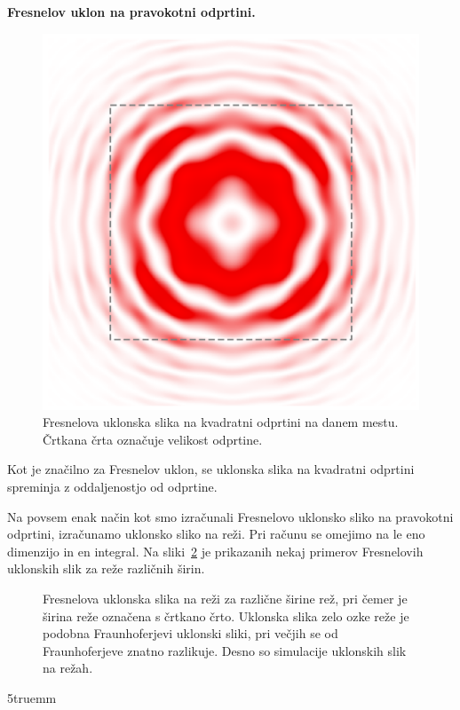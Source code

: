\begin{example}{\bf Fresnelov uklon na pravokotni odprtini.}
\begin{figure}[ht]
\includegraphics[width=50truemm]{slike/05_FresKvadrat.png}
\caption{Fresnelova uklonska slika na kvadratni odprtini na danem mestu. 
Črtkana črta označuje velikost odprtine.}
\label{fig:05_FrKv}
\end{figure}
Kot je značilno za Fresnelov uklon, se uklonska slika na kvadratni odprtini spreminja
z oddaljenostjo od odprtine. 

Na povsem enak način kot smo izračunali Fresnelovo uklonsko sliko na pravokotni odprtini,
izračunamo uklonsko sliko na reži. Pri računu se omejimo
na le eno dimenzijo in en integral. Na sliki~\ref{fig:05_FrReza} je prikazanih nekaj 
primerov Fresnelovih uklonskih slik za reže različnih širin. 
\begin{figure}[!ht]
\centering
\def\svgwidth{140truemm} 

\caption{Fresnelova uklonska slika na reži za različne širine rež, pri čemer je 
širina reže označena s črtkano črto. Uklonska slika
zelo ozke reže je podobna Fraunhoferjevi uklonski sliki, pri večjih se od Fraunhoferjeve 
znatno razlikuje. Desno so simulacije uklonskih
slik na režah.}
\label{fig:05_FrReza}
\end{figure}
\vglue5truemm

\end{example}


